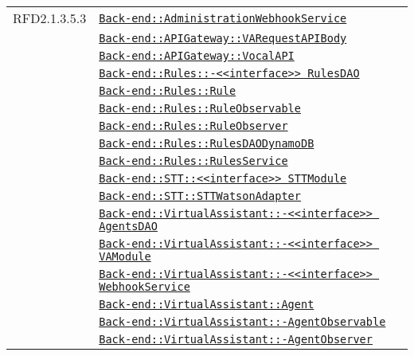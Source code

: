 \begin{longtable}{|>{\centering}m{3cm}|m{10cm}<{\centering}|}
RFD2.1.3.5.3 & \hyperref[Back-end::AdministrationWebhookService]{\texttt{Back-end::AdministrationWebhookService}}\\
& \hyperref[Back-end::APIGateway::VARequestAPIBody]{\texttt{Back-end::APIGateway::VARequestAPIBody}}\\
& \hyperref[Back-end::APIGateway::VocalAPI]{\texttt{Back-end::APIGateway::VocalAPI}}\\
& \hyperref[Back-end::Rules::<<interface>> RulesDAO]{\texttt{Back-end::Rules::-\linebreak <<interface>> RulesDAO}}\\
& \hyperref[Back-end::Rules::Rule]{\texttt{Back-end::Rules::Rule}}\\
& \hyperref[Back-end::Rules::RuleObservable]{\texttt{Back-end::Rules::RuleObservable}}\\
& \hyperref[Back-end::Rules::RuleObserver]{\texttt{Back-end::Rules::RuleObserver}}\\
& \hyperref[Back-end::Rules::RulesDAODynamoDB]{\texttt{Back-end::Rules::RulesDAODynamoDB}}\\
& \hyperref[Back-end::Rules::RulesService]{\texttt{Back-end::Rules::RulesService}}\\
& \hyperref[Back-end::STT::<<interface>> STTModule]{\texttt{Back-end::STT::<<interface>> STTModule}}\\
& \hyperref[Back-end::STT::STTWatsonAdapter]{\texttt{Back-end::STT::STTWatsonAdapter}}\\
& \hyperref[Back-end::VirtualAssistant::<<interface>> AgentsDAO]{\texttt{Back-end::VirtualAssistant::-\linebreak <<interface>> AgentsDAO}}\\
& \hyperref[Back-end::VirtualAssistant::<<interface>> VAModule]{\texttt{Back-end::VirtualAssistant::-\linebreak <<interface>> VAModule}}\\
& \hyperref[Back-end::VirtualAssistant::<<interface>> WebhookService]{\texttt{Back-end::VirtualAssistant::-\linebreak <<interface>> WebhookService}}\\
& \hyperref[Back-end::VirtualAssistant::Agent]{\texttt{Back-end::VirtualAssistant::Agent}}\\
& \hyperref[Back-end::VirtualAssistant::AgentObservable]{\texttt{Back-end::VirtualAssistant::-\linebreak AgentObservable}}\\
& \hyperref[Back-end::VirtualAssistant::AgentObserver]{\texttt{Back-end::VirtualAssistant::-\linebreak AgentObserver}}\\

\end{longtable}

